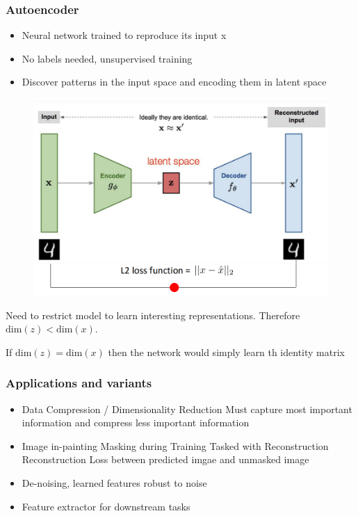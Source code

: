 \subsubsection{Autoencoder}
\begin{itemize}
    \item Neural network trained to reproduce its input x
    \item No labels needed, unsupervised training
    \item Discover patterns in the input space and encoding them in latent space
\end{itemize}
\begin{figure}[!h]
     \includegraphics[width = \columnwidth]{figures/GenAI2/Autoencoder.png}
\end{figure}

Need to restrict model to learn interesting representations.
Therefore \(\text{dim}(z) < \text{dim}(x)\).

If \(\text{dim}(z) = \text{dim}(x)\) then the network would simply learn th identity matrix
 
\subsubsection*{Applications and variants}
\begin{itemize}
    \item Data Compression / Dimensionality Reduction
    \subitem Must capture most important information and compress less important information
    \item Image in-painting
    \subitem Masking during Training
    \subitem Tasked with Reconstruction
    \subitem Reconstruction Loss between predicted imgae and unmasked image
    \item De-noising, learned features robust to noise
    \item Feature extractor for downstream tasks 
\end{itemize}

